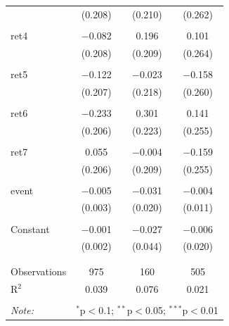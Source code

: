 \begin{table}[!htbp]
\begin{tabular}{@{\extracolsep{5pt}}lccc}
  & (0.208) & (0.210) & (0.262) \\ 
  & & & \\ 
 ret4 & $-$0.082 & 0.196 & 0.101 \\ 
  & (0.208) & (0.209) & (0.264) \\ 
  & & & \\ 
 ret5 & $-$0.122 & $-$0.023 & $-$0.158 \\ 
  & (0.207) & (0.218) & (0.260) \\ 
  & & & \\ 
 ret6 & $-$0.233 & 0.301 & 0.141 \\ 
  & (0.206) & (0.223) & (0.255) \\ 
  & & & \\ 
 ret7 & 0.055 & $-$0.004 & $-$0.159 \\ 
  & (0.206) & (0.209) & (0.255) \\ 
  & & & \\ 
 event & $-$0.005 & $-$0.031 & $-$0.004 \\ 
  & (0.003) & (0.020) & (0.011) \\ 
  & & & \\ 
 Constant & $-$0.001 & $-$0.027 & $-$0.006 \\ 
  & (0.002) & (0.044) & (0.020) \\ 
  & & & \\ 
\hline \\[-1.8ex] 
Observations & 975 & 160 & 505 \\ 
R$^{2}$ & 0.039 & 0.076 & 0.021 \\ 
\hline 
\hline \\[-1.8ex] 
\textit{Note:}  & \multicolumn{3}{r}{$^{*}$p$<$0.1; $^{**}$p$<$0.05; $^{***}$p$<$0.01} \\ 
\end{tabular} 
\end{table} 
